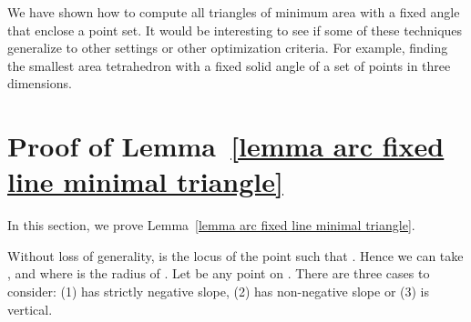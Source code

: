 \documentclass[11pt, oneside]{article}
\begin{document}
We have shown how to compute 
all triangles of minimum area 
with a fixed angle  
that enclose a point set.
It would be interesting to see 
if some of these techniques generalize 
to other settings or other optimization criteria.
For example,
finding the smallest area tetrahedron with a fixed solid angle
of a set of points in three dimensions.






\appendix

\section{Proof of Lemma~\ref{lemma arc fixed line minimal triangle}}
\label{appendix proof lemma}

In this section,
we prove Lemma~\ref{lemma arc fixed line minimal triangle}.

\proof
Without loss of generality,
 is the locus of the point 
such that .
Hence we can take
,
and 
where  is the radius of .
Let  be any point on .
There are three cases to consider:
(1)  has strictly negative slope,
(2)  has non-negative slope
or (3)  is vertical.
\end{document}
